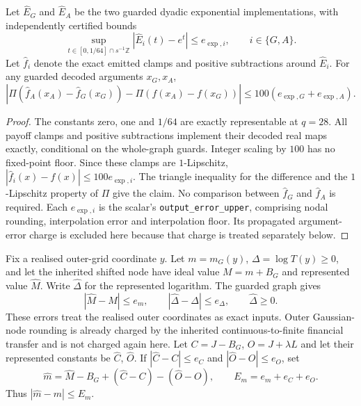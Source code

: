 \begin{lemma}
\label{lem:raw-asymmetric-scalar}
Let $\widehat E_G$ and $\widehat E_A$ be the two guarded dyadic
exponential implementations, with independently certified bounds
\begin{equation}
 \sup_{t\in[0,1/64]\cap s^{-1}\mathbb Z}
 |\widehat E_i(t)-e^t|\leq e_{\exp,i},\qquad i\in\{G,A\}.
\end{equation}
Let $\widehat f_i$ denote the exact emitted clamps and positive
subtractions around $\widehat E_i$. For any guarded decoded arguments
$x_G,x_A$,
\begin{equation}
 \left|\Pi(\widehat f_A(x_A)-\widehat f_G(x_G))
          -\Pi(f(x_A)-f(x_G))\right|
 \leq100(e_{\exp,G}+e_{\exp,A}).
\end{equation}
\end{lemma}
\begin{proof}
The constants zero, one and $1/64$ are exactly representable at
$q=28$. All payoff clamps and positive subtractions implement their
decoded real maps exactly, conditional on the whole-graph guards.
Integer scaling by $100$ has no fixed-point floor. Since these clamps
are $1$-Lipschitz, $|\widehat f_i(x)-f(x)|\leq100e_{\exp,i}$.
The triangle inequality for the difference and the $1$-Lipschitz
property of $\Pi$ give the claim. No comparison between
$\widehat f_G$ and $\widehat f_A$ is required. Each $e_{\exp,i}$
is the scalar's \texttt{output\_error\_upper}, comprising nodal
rounding, interpolation error and interpolation floor. Its propagated
argument-error charge is excluded here because that charge is treated
separately below.
\end{proof}

Fix a realised outer-grid coordinate $y$. Let $m=m_G(y)$,
$\Delta=\log T(y)\geq0$, and let the inherited shifted node have
ideal value $M=m+B_G$ and represented value $\widehat M$.
Write $\widehat\Delta$ for the represented logarithm. The guarded
graph gives
\begin{equation}
 |\widehat M-M|\leq e_m,\qquad
 |\widehat\Delta-\Delta|\leq e_\Delta,\qquad
 \widehat\Delta\geq0.
\end{equation}
These errors treat the realised outer coordinates as exact inputs.
Outer Gaussian-node rounding is already charged by the inherited
continuous-to-finite financial transfer and is not charged again here.
Let $C=J-B_G$, $O=J+\lambda L$ and let their represented constants
be $\widehat C$, $\widehat O$. If
$|\widehat C-C|\leq e_C$ and $|\widehat O-O|\leq e_O$, set
\begin{equation}
 \widehat m=\widehat M-B_G+(\widehat C-C)-(\widehat O-O),
 \qquad E_m=e_m+e_C+e_O.
\end{equation}
Thus $|\widehat m-m|\leq E_m$.

